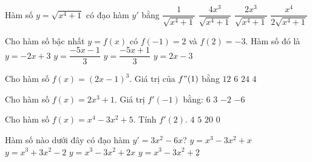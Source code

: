 \begin{ex}%
	Hàm số $y=\sqrt{x^4+1}$ có đạo  hàm $y'$ bằng
	\choice 
		{$\dfrac{1}{\sqrt{x^4+1}}$} 
		{$\dfrac{4x^3}{\sqrt{x^4+1}}$} 
		{\True  $\dfrac{2x^3}{\sqrt{x^4+1}}$}
		 {$\dfrac{x^4}{2\sqrt{x^4+1}}$}
\end{ex}

\begin{ex}%
	Cho hàm số bậc nhất $ y=f(x) $ có $  f(-1)=2 $ và $ f(2)=-3 $. Hàm số đó là
	\choice 
		 {$y=-2x+3$}
		{$ y=\dfrac{-5x-1}{3}$} 
		{\True  $y=\dfrac{-5x+1}{3}$}
		 {$y=2x-3 $}
\end{ex}

\begin{ex}%
	Cho hàm số $f(x)=(2 x-1)^3$. Giá trị của $f"(1)$  bằng
	\choice 
		{$12$} 
		{$6$} 
		{\True  $24$}
		 {$4$}
\end{ex}

\begin{ex}%
	Cho  hàm số $f(x)=2x^{3}+1$. Giá trị $f'(-1)$ bằng:
	 \choice
		{\True  $6$}
		{$3$} 
		{$-2$} 
		 {$-6$}
\end{ex}

\begin{ex}%
	Cho  hàm số $ f(x)=x^4-3x^2+5. $ Tính $ f'(2).$
	 \choice
		{$ 4  $}
		{$  5 $}
		{\True $ 20  $}
		{$ 0  $}
\end{ex}

\begin{ex}%
	Hàm số nào  dưới đây có đạo hàm $y'=3x^2-6x$?
	 \choice
		{$y=x^3-3x^2+x$} 
		 {$y=x^3+3x^2-2$}
		 {$y=x^3-3x^2+2x$}
		 {\True $y=x^3-3x^2+2$}
\end{ex}


